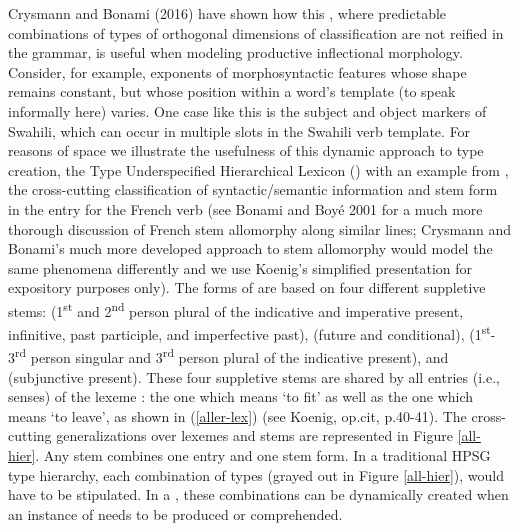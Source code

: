 \documentclass[output=paper]{langsci/langscibook}
\begin{document}
Crysmann and Bonami (2016) have shown how this , where predictable combinations of types of orthogonal dimensions of classification are not reified in the grammar, is useful when modeling productive inflectional morphology. Consider, for example, exponents of morphosyntactic features whose shape remains constant, but whose position within a word's template (to speak informally here) varies. One case like this is the subject and object markers of Swahili, which can occur in multiple slots in the Swahili verb template. For reasons of space we illustrate the usefulness of this dynamic approach to type creation, the Type Underspecified Hierarchical Lexicon () with an example from \citet{Koenig99a}, the cross-cutting classification of syntactic/semantic information and stem form in the entry for the French verb  (see  Bonami and Boyé 2001 for a much more thorough discussion of French stem allomorphy along similar lines; Crysmann and Bonami's much more developed approach to stem allomorphy would model the same phenomena differently and we use Koenig's simplified presentation for expository purposes only). The forms of  are based on four different suppletive stems:  (1\textsuperscript{st} and 2\textsuperscript{nd} person plural of the indicative and imperative present, infinitive, past participle, and imperfective past),  (future and conditional),  (1\textsuperscript{st}-3\textsuperscript{rd} person singular and 3\textsuperscript{rd} person plural of the indicative present), and  (subjunctive present). These four suppletive stems are shared by all entries (i.e., senses) of the lexeme : the one which means `to fit' as well as the one which means `to leave', as shown in (\ref{aller-lex}) (see Koenig, op.cit, p.40-41). The cross-cutting generalizations over lexemes and stems are represented in Figure \ref{all-hier}. Any  stem combines one entry and one stem form. In a traditional HPSG type hierarchy, each combination of types (grayed out in Figure \ref{all-hier}), would have to be stipulated. In a , these combinations can be dynamically created when an instance of  needs to be produced or comprehended.
\end{document}
